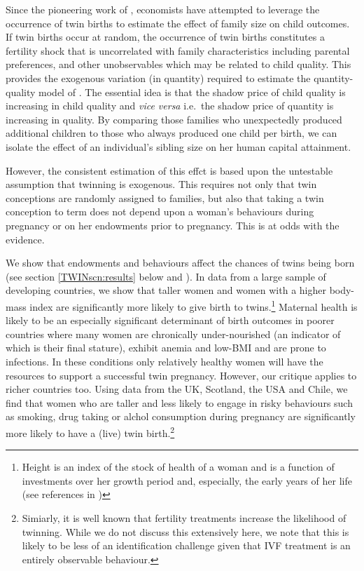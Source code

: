 Since the pioneering work of \citet{RosenzweigWolpin1980}, economists have 
attempted to leverage the occurrence of twin births to estimate the effect of 
family size on child outcomes. If twin births occur at random, the occurrence of 
twin births constitutes a fertility shock that is uncorrelated with family 
characteristics including parental preferences, and other unobservables which may 
be related to child quality. This provides the exogenous variation (in quantity) 
required to estimate the quantity-quality model of \citet{Becker1960,
BeckerLewis1973,BeckerTomes1976}.  The essential idea is that the shadow price of 
child quality is increasing in child quality and \emph{vice versa} i.e.\ the 
shadow price of quantity is increasing in quality.  By comparing those families who 
unexpectedly produced additional children to those who always produced one child
per birth, we can isolate the effect of an individual's sibling size on her human 
capital attainment.

However, the consistent estimation of this effct is based upon the untestable 
assumption that twinning is exogenous. This requires not only that twin conceptions 
are randomly assigned to families, but also that taking a twin conception to term 
does not depend upon a woman's behaviours during pregnancy or on her endowments
prior to pregnancy. This is at odds with the evidence.

We show that endowments and behaviours affect the chances of twins being born (see 
section \ref{TWINscn:results} below and \citet{BhalotraClarke2014}). In data from 
a large sample of developing countries, we show that taller women and women with a 
higher body-mass index are significantly more likely to give birth to twins.\footnote{
Height is an index of the stock of health of a woman and is a function of investments 
over her growth period and, especially, the early years of her life (see references 
in \citet{BhalotraRawlings2013})} Maternal health is likely to be an especially significant 
determinant of birth outcomes in poorer countries where many women are chronically 
under-nourished (an indicator of which is their final stature), exhibit anemia and 
low-BMI and are prone to infections. In these conditions only relatively healthy 
women will have the resources to support a successful twin pregnancy. However, our 
critique applies to richer countries too. Using data from the UK, Scotland, the USA 
and Chile, we find that women who are taller and less likely to engage in risky
behaviours such as smoking, drug taking or alchol consumption during pregnancy are 
significantly more likely to have a (live) twin birth.\footnote{Simiarly, it is 
well known that fertility treatments increase the likelihood of twinning. While we 
do not discuss this extensively here, we note that this is likely to be less of an 
identification challenge given that IVF treatment is an entirely observable 
behaviour.}

